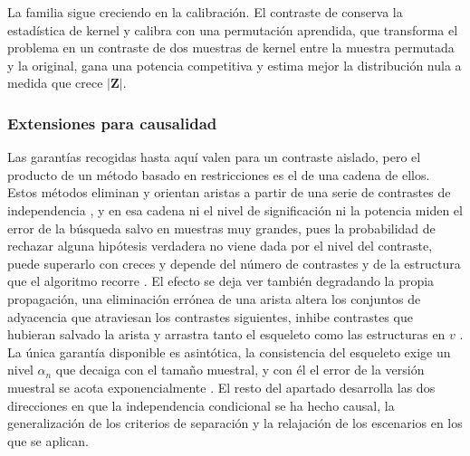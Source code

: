 La familia sigue creciendo en la calibración. El contraste de \citet{doran2014permutation} conserva
la estadística de kernel y calibra con una permutación aprendida, que transforma el problema
en un contraste de dos muestras de kernel entre la muestra permutada y la original, gana
una potencia competitiva y estima mejor la distribución nula a medida que crece
$|\mathbf{Z}|$.

\subsubsection{Extensiones para causalidad}
Las garantías recogidas hasta aquí valen para un contraste aislado, pero el producto de un
método basado en restricciones es el de una cadena de ellos. Estos métodos eliminan y
orientan aristas a partir de una serie de contrastes de independencia \citep{kitson2023survey, glymour2019review},
y en esa cadena ni el nivel de significación ni la potencia miden el error de la búsqueda
salvo en muestras muy grandes, pues la probabilidad de rechazar alguna hipótesis verdadera
no viene dada por el nivel del contraste, puede superarlo con creces y depende del número de
contrastes y de la estructura que el algoritmo recorre \citep{spirtes2000causation}. El
efecto se deja ver también degradando la propia propagación, una eliminación errónea de
una arista altera los conjuntos de adyacencia que atraviesan los contrastes siguientes,
inhibe contrastes que hubieran salvado la arista y arrastra tanto el esqueleto como las
estructuras en $v$ \citep{colombo2014order}. La única garantía disponible es asintótica,
la consistencia del esqueleto exige un nivel $\alpha_n$ que decaiga con el tamaño muestral,
y con él el error de la versión muestral se acota exponencialmente
\citep{kalisch2007estimating}. El resto del apartado desarrolla las dos direcciones en que
la independencia condicional se ha hecho causal, la generalización de los criterios de
separación y la relajación de los escenarios en los que se aplican.

